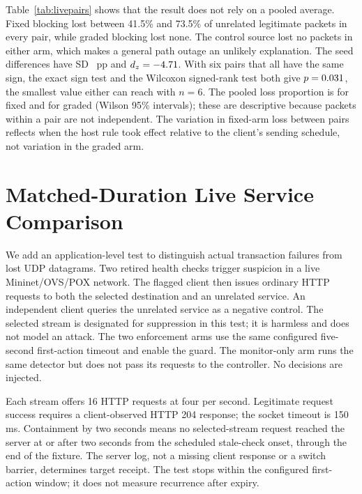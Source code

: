 \documentclass[conference]{IEEEtran}
\begin{document}
Table~\ref{tab:livepairs} shows that the result does not rely on a pooled average.
Fixed blocking lost between 41.5\% and 73.5\% of unrelated legitimate packets in
every pair, while graded blocking lost none. The control source lost no packets in
either arm, which makes a general path outage an unlikely explanation. The
seed differences have SD \LiveSD{}~pp and $d_z=-4.71{}$. With six pairs that all
have the same sign, the exact sign test and the Wilcoxon signed-rank test both give
$p=0.031{}$, the smallest value either can reach with $n=6$. The pooled loss
proportion is \LiveFixedWilson{} for fixed and \LiveGradedWilson{} for graded
(Wilson 95\% intervals); these are descriptive because packets within a pair are not
independent. The variation in fixed-arm loss between pairs reflects when the host
rule took effect relative to the client's sending schedule, not variation in the
graded arm.

\section{Matched-Duration Live Service Comparison}
\label{sec:live-service}
We add an application-level test to distinguish actual transaction failures from
lost UDP datagrams. Two retired health checks trigger suspicion in a live
Mininet/OVS/POX network. The flagged client then issues ordinary HTTP requests to
both the selected destination and an unrelated service. An independent client
queries the unrelated service as a negative control. The selected stream is
designated for suppression in this test; it is harmless and does not model an
attack. The two enforcement arms use the same configured five-second first-action
timeout and enable the guard. The monitor-only arm runs the same detector but
does not pass its requests to the controller. No decisions are injected.

Each stream offers 16 HTTP requests at four per second. Legitimate request
success requires a client-observed HTTP 204 response; the socket timeout is
150\,ms. Containment by two seconds means no selected-stream request reached
the server at or after two seconds from the scheduled stale-check onset,
through the end of the fixture. The server log, not a missing client response
or a switch barrier, determines target receipt. The test stops within the
configured first-action window; it does not measure recurrence after expiry.
\end{document}
